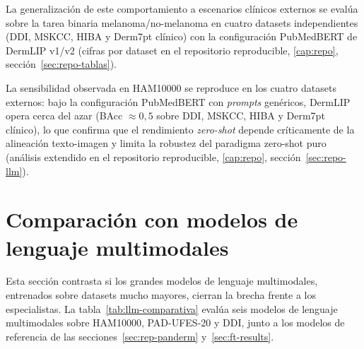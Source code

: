 La generalización de este comportamiento a escenarios clínicos
externos se evalúa sobre la tarea binaria melanoma/no-melanoma en
cuatro datasets independientes
(DDI, MSKCC, HIBA y Derm7pt clínico) con la configuración
PubMedBERT de DermLIP v1/v2 (cifras por dataset en el repositorio
reproducible, \ref{cap:repo}, sección~\ref{sec:repo-tablas}).

La sensibilidad observada en HAM10000 se reproduce en los cuatro
datasets externos: bajo la configuración PubMedBERT con \emph{prompts}
genéricos, DermLIP opera cerca del azar (BAcc $\approx 0{,}5$ sobre
DDI, MSKCC, HIBA y Derm7pt clínico), lo que
confirma que el rendimiento \emph{zero-shot} depende críticamente de la
alineación texto-imagen y limita la robustez del paradigma zero-shot
puro (análisis extendido en el repositorio reproducible, \ref{cap:repo}, sección~\ref{sec:repo-llm}).

\section{Comparación con modelos de lenguaje multimodales}
\label{sec:llm-results}

Esta sección contrasta si los grandes modelos de lenguaje
multimodales, entrenados sobre datasets mucho mayores, cierran la
brecha frente a los especialistas. La
tabla~\ref{tab:llm-comparativa} evalúa seis modelos de lenguaje
multimodales sobre HAM10000, PAD-UFES-20 y DDI, junto a los modelos de
referencia de las secciones~\ref{sec:rep-panderm}
y~\ref{sec:ft-results}.

